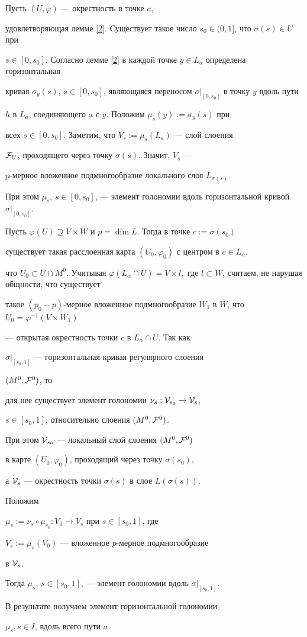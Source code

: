\begin{pf}


Пусть $(U,\varphi)$ --- окрестность в точке $a$,


удовлетворяющая лемме \ref{2}. Существует такое число $s_0\in (0,1]$, что $\sigma(s)\in U$ при


$s\in [0,s_0]$. Согласно лемме \ref{2} в каждой точке $y\in L_a$ определена горизонтальная


кривая $\sigma_y(s)$, $s\in [0,s_0]$, являющаяся переносом $\sigma|_{[0,s_0]}$ в точку $y$ вдоль пути


$h$ в $L_a$, соединяющего $a$ с $y$. Положим $\mu_s(y):=\sigma_y(s)$ при


всех $s\in [0,s_0]$. Заметим, что $V_s:=\mu_s(L_a)$ --- слой слоения


${\cal F}_U$, проходящего через точку $\sigma(s)$. Значит, $V_s$ ---


$p$-мерное вложенное подмногообразие локального слоя $L_{\sigma(s)}$.


При этом $\mu_s$, $s\in


[0,s_0]$, --- элемент голономии вдоль горизонтальной кривой $\sigma|_{[0,s_0]}$.


Пусть $\varphi(U)\supseteq V\times W$ и $p=\dim L$. Тогда в точке $c:=\sigma(s_0)$


существует такая расслоенная карта $(U_0,\varphi_0)$ с центром в $c\in L_{\alpha}$,


что $U_0\subset U\cap M^0$. Учитывая $\varphi(L_{\alpha}\cap


U)=V\times l, $ где $l\subset W$, считаем, не нарушая общности, что существует


такое $(p_0-p)$-мерное вложенное подмногообразие $W_1$ в $W$, что $U_0=\varphi^{-1}(V\times W_1)$


--- открытая окрестность точки $c$ в $L_{\alpha}\cap U$. Так как


$\sigma|_{[s_0,1]}$ --- горизонтальная кривая регулярного слоения


$(M^0,{\cal F}^0)$, то


для нее существует элемент голономии $\nu_s: {\cal V}_{s_0}\to {\cal V}_s$,


$s\in [s_0,1]$, относительно слоения $(M^0,{\cal F}^0)$.


При этом ${\cal V}_{s_0}$ --- локальный слой слоения $(M^0,{\cal F}^0)$


в карте $(U_0,\varphi_0)$, проходящий через точку $\sigma(s_0)$,


а ${\cal V}_{s}$ --- окрестность точки $\sigma(s)$ в слое $L(\sigma(s))$.


Положим


$\mu_s:=\nu_s\circ\mu_{s_0}: V_0\to V_s$ при $s\in [s_0,1]$, где


$V_{s}:=\mu_s(V_0)$ --- вложенное $p$-мерное подмногообразие


в ${\cal V}_s$.


Тогда $\mu_s$, $s\in [s_0,1]$, --- элемент голономии вдоль $\sigma|_{[s_0,1]}$.


В результате получаем элемент горизонтальной голономии


$\mu_s,s\in I$, вдоль всего пути $\sigma$.


\end{pf}
